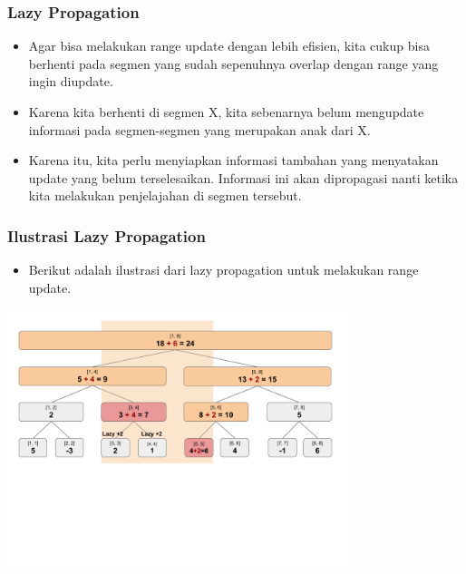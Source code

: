 \begin{frame}
\frametitle{Lazy Propagation}
\begin{itemize}
  \item Agar bisa melakukan range update dengan lebih efisien, kita cukup bisa berhenti pada segmen yang sudah sepenuhnya overlap dengan range yang ingin diupdate.
  \item Karena kita berhenti di segmen X, kita sebenarnya belum mengupdate informasi pada segmen-segmen yang merupakan anak dari X.
  \item Karena itu, kita perlu menyiapkan informasi tambahan yang menyatakan update yang belum terselesaikan. Informasi ini akan dipropagasi nanti ketika kita melakukan penjelajahan di segmen tersebut.
\end{itemize}
\end{frame}

\begin{frame}
\frametitle{Ilustrasi Lazy Propagation}
\begin{itemize}
  \item Berikut adalah ilustrasi dari lazy propagation untuk melakukan range update.
\end{itemize}
\begin{center}
  \includegraphics[width=10cm]{asset/segtree-update-lazy.png}
\end{center}
\end{frame}

